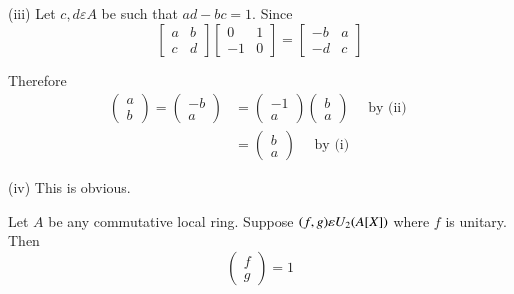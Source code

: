 (iii) Let $c,d\varepsilon A$ be such that $ad-bc=1$. Since
$$
\begin{bmatrix}
a & b\\
c & d
\end{bmatrix} \begin{bmatrix}
0 & 1\\
-1 & 0
\end{bmatrix} = \begin{bmatrix}
-b & a\\
-d & c
\end{bmatrix}
$$

Therefore
\begin{align*}
\begin{pmatrix}
a\\
b
\end{pmatrix} = \begin{pmatrix}
-b\\
a
\end{pmatrix}&= \begin{pmatrix}
-1\\
a
\end{pmatrix} \begin{pmatrix}
b\\
a
\end{pmatrix}\quad \text{ by (ii) }\\
&=\begin{pmatrix}
b\\
a
\end{pmatrix} \quad\text{ by (i) }
\end{align*}

(iv) This is obvious.

\begin{lem}\label{c2:lem3.6}
Let $A$ be any commutative local ring. Suppose $(f,g)\varepsilon\\
U_2(A[X])$ where $f$ is unitary. Then 
$$
\begin{pmatrix}
f\\
g
\end{pmatrix} =1
$$
\end{lem}

